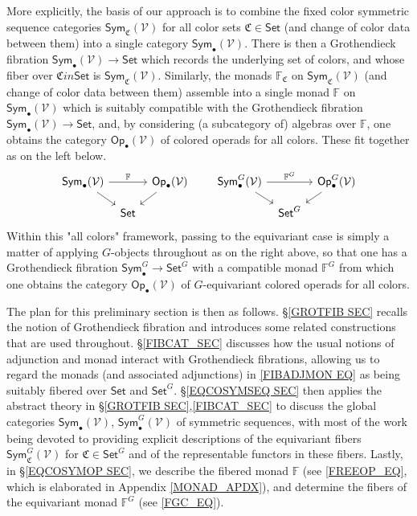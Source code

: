 \documentclass[a4paper,10pt
,draft
]{article}%
\numberwithin{equation}{section}
\numberwithin{figure}{section}
\theoremstyle{definition} %
\newcommand{\Sym}{\ensuremath{\mathsf{Sym}}}%
\newcommand{\Op}{\mathsf{Op}}%
\newcommand{\V}{\ensuremath{\mathcal V}}
\newcommand{\1}{\ensuremath{\mathbbm 1}}%
\begin{document}
More explicitly, the basis of our approach is to combine the 
fixed color symmetric sequence categories
$\mathsf{Sym}_{\mathfrak{C}}(\V)$ for all color sets 
$\mathfrak{C} \in \mathsf{Set}$
(and change of color data between them)
into a single category $\mathsf{Sym}_{\bullet}(\V)$.
There is then a Grothendieck fibration
$\mathsf{Sym}_{\bullet}(\V) \to \mathsf{Set}$
which records the underlying set of colors,
and whose fiber over $\mathfrak{C} in \mathsf{Set}$ is 
$\mathsf{Sym}_{\mathfrak{C}}(\V)$.
Similarly, the monads $\mathbb{F}_{\mathfrak{C}}$
on $\mathsf{Sym}_{\mathfrak{C}}(\mathcal{V})$
(and change of color data between them) 
assemble into a single monad $\mathbb{F}$
on $\mathsf{Sym}_{\bullet}(\V)$
which is suitably compatible with 
the Grothendieck fibration 
$\mathsf{Sym}_{\bullet}(\V) \to \mathsf{Set}$,
and, by considering (a subcategory of) algebras over $\mathbb{F}$,
one obtains the category $\mathsf{Op}_{\bullet}(\V)$
of colored operads for all colors.
These fit together as on the left below.
\begin{equation}\label{FIBADJMON EQ}
\begin{tikzcd}[row sep = small, column sep = tiny]
\Sym_\bullet(\V) \arrow[rr, "\mathbb F"] \arrow[dr]
&&
\Op_\bullet(\V) \arrow[dl]
&&& %
\Sym^G_\bullet(\V) \arrow[rr, "\mathbb F^G"] \arrow[dr]
&&
\Op^G_\bullet(\V) \arrow[dl]
\\
&
\mathsf{Set}
&
&&& %
&
\mathsf{Set}^G
\end{tikzcd}
\end{equation}
Within this "all colors" framework, passing to the equivariant case is simply a matter of applying $G$-objects throughout as on the right above, 
so that one has a Grothendieck fibration
$\mathsf{Sym}_{\bullet}^G \to \mathsf{Set}^G$
with a compatible monad $\mathbb{F}^G$
from which one obtains the category 
$\mathsf{Op}_{\bullet}(\V)$
of $G$-equivariant colored operads for all colors. 


The plan for this preliminary section is then as follows.
%
\S \ref{GROTFIB SEC} recalls the notion of Grothendieck fibration and
introduces some related constructions that are used throughout.
%
\S \ref{FIBCAT_SEC} discusses how the usual notions of adjunction and monad interact with Grothendieck fibrations,
allowing us to regard the monads
(and associated adjunctions)
in \eqref{FIBADJMON EQ}
as being suitably fibered over $\mathsf{Set}$ and $\mathsf{Set}^G$.
%
\S \ref{EQCOSYMSEQ SEC} then applies the abstract theory in 
\S \ref{GROTFIB SEC},\ref{FIBCAT_SEC}
to discuss the global categories
$\mathsf{Sym}_{\bullet}(\V)$,
$\mathsf{Sym}^G_{\bullet}(\V)$
of symmetric sequences, 
with most of the work being devoted to providing 
explicit descriptions of the equivariant fibers
$\mathsf{Sym}^G_{\mathfrak{C}}(\V)$
for $\mathfrak{C} \in \mathsf{Set}^G$
and of the representable functors in these fibers.
%
Lastly, in \S \ref{EQCOSYMOP SEC}, 
we describe the fibered monad $\mathbb F$ 
(see \eqref{FREEOP_EQ}, which is elaborated in Appendix \ref{MONAD_APDX}),
and determine the fibers of the equivariant monad $\mathbb F^G$ (see \eqref{FGC_EQ}).
\end{document}
